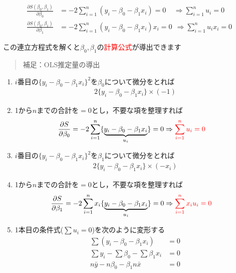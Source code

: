 \documentclass[
]{book}
\theoremstyle{definition}
\theoremstyle{definition}
\theoremstyle{definition}
\theoremstyle{definition}
\theoremstyle{remark}
\begin{document}
\begin{align*}
\frac{\partial S(\beta_0,\beta_1)}{\partial \beta_0}&
=-2 \sum_{i=1}^n (y_i-\beta_0-\beta_1 x_i)=0 
~~~~~\Rightarrow 
\sum_{i=1}^n u_i=0 
\\
\frac{\partial S(\beta_0,\beta_1)}{\partial \beta_1}&
=-2 \sum_{i=1}^n (y_i-\beta_0-\beta_1 x_i) x_i=0
~~\Rightarrow 
\sum_{i=1}^n u_i x_i=0 
\end{align*}

この連立方程式を解くと\(\beta_0,\beta_1\)の\textcolor{red}{計算公式}が導出できます

\begin{quote}
補足：OLS推定量の導出
\end{quote}

\begin{enumerate}
\def\labelenumi{\arabic{enumi}.}
\item
  \(i\)番目の\(\{ y_i-\beta_0-\beta_1 x_i \}^2\)を\(\beta_0\)について微分をとれば
  \begin{align*}
  2 \{ y_i-\beta_0-\beta_1 x_i \} \times (-1)
  \end{align*}
\item
  1から\(n\)までの合計を\(=0\)とし，不要な項を整理すれば
  \begin{align*}
  \frac{\partial S}{\partial \beta_0}
  =
  -2 \sum_{i=1}^n \{ \underbrace{y_i-\beta_0-\beta_1 x_i}_{u_i} \}&=0 \Rightarrow 
  \textcolor{red}{\sum_{i=1}^n u_i=0}
  \end{align*}
\item
  \(i\)番目の\(\{ y_i-\beta_0-\beta_1 x_i \}^2\)を\(\beta_1\)について微分をとれば
  \begin{align*}
  2 \{ y_i-\beta_0-\beta_1 x_i \} \times (-x_i)
  \end{align*}
\item
  1から\(n\)までの合計を\(=0\)とし，不要な項を整理すれば
  \begin{align*}
  \frac{\partial S}{\partial \beta_1}
  =
  -2 \sum_{i=1}^n x_i \{ \underbrace{y_i-\beta_0-\beta_1 x_i}_{u_i} \}&=0 \Rightarrow 
  \textcolor{red}{\sum_{i=1}^n x_i u_i=0}
  \end{align*}
\item
  1本目の条件式(\(\sum u_i=0\))を次のように変形する
  \begin{align*}
  \sum (y_i-\beta_0-\beta_1 x_i)&=0 \\
  \sum y_i-\sum \beta_0-\sum \beta_1 x_i &=0 \\
  n \bar{y}-n \beta_0-\beta_1 n \bar{x} &=0 \\

\end{align*}
\end{enumerate}
\end{document}

